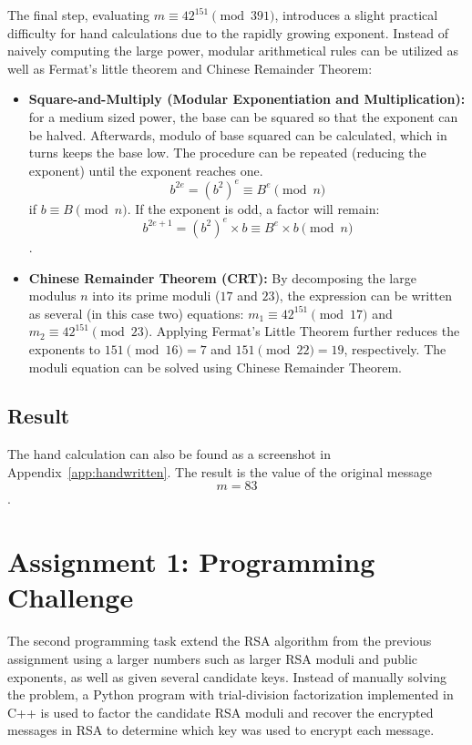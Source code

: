 \documentclass[11pt,a4paper]{article}
\begin{document}
The final step, evaluating $m \equiv 42^{151} \pmod{391}$, introduces a slight practical difficulty for hand calculations due to the rapidly growing exponent. Instead of naively computing the large power, modular arithmetical rules can be utilized as well as Fermat's little theorem and Chinese Remainder Theorem:
\begin{itemize}
    \item \textbf{Square-and-Multiply (Modular Exponentiation and Multiplication):} for a medium sized power, the base can be squared so that the exponent can be halved. Afterwards, modulo of base squared can be calculated, which in turns keeps the base low. The procedure can be repeated (reducing the exponent) until the exponent reaches one. $$b^{2e} = (b^2)^e \equiv B^e \pmod{n}$$ if $b \equiv B \pmod{n}$. If the exponent is odd, a factor will remain: $$b^{2e+1} = (b^2)^e \times b \equiv B^e\times b \pmod{n}$$.
    \item \textbf{Chinese Remainder Theorem (CRT):} By decomposing the large modulus $n$ into its prime moduli ($17$ and $23$), the expression can be written as several (in this case two) equations: $m_1 \equiv 42^{151} \pmod{17}$ and $m_2 \equiv 42^{151} \pmod{23}$. Applying Fermat's Little Theorem further reduces the exponents to $151 \pmod{16} = 7$ and $151 \pmod{22} = 19$, respectively. The moduli equation can be solved using Chinese Remainder Theorem.
\end{itemize}


\subsection*{Result}

The hand calculation can also be found as a screenshot in Appendix~\ref{app:handwritten}. The result is the value of the original message $$m=83$$.


\section*{Assignment 1: Programming Challenge}

The second programming task extend the RSA algorithm from the previous assignment using a larger numbers such as larger RSA moduli and public exponents, as well as given several candidate keys. Instead of manually solving the problem, a Python program with trial-division factorization implemented in C++ is used to factor the candidate RSA moduli and recover the encrypted messages in RSA to determine which key was used to encrypt each message.
\end{document}

